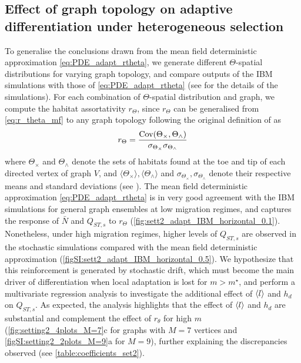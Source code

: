   \subsection{Effect of graph topology on adaptive differentiation under heterogeneous selection}\label{sec:result2b}
  To generalise the conclusions drawn from the mean field deterministic approximation \cref{eq:PDE_adapt_rtheta}, we generate different $\Theta$-spatial distributions for varying graph topology, and compare outputs of the IBM simulations with those of \cref{eq:PDE_adapt_rtheta} (see  for the details of the simulations). For each combination of $\Theta$-spatial distribution and graph, we compute the habitat assortativity $r_\Theta$, since $r_\Theta$ can be generalised from \cref{eq:r_theta_mf} to any graph topology following the original definition of \cite{Newman2003a} as
  \begin{equation}\label{eq:r_theta}
	r_\Theta = \frac{\mbox{Cov}({ \Theta}_\times, { \Theta}_\wedge)}{\sigma_{{ \Theta}_\times} \sigma_{{ \Theta}_\wedge}}
  \end{equation}
  where ${ \Theta}_\times$ and ${ \Theta}_\wedge$ denote the sets of habitats found at the toe and tip of each directed vertex of graph $V$, and $\langle { \Theta}_\times \rangle, \langle {\Theta}_\wedge \rangle$ and $\sigma_{{\Theta}_\times}, \sigma_{{\Theta}_\wedge}$ denote their respective means and standard deviations (see ). 
  The mean field deterministic approximation \cref{eq:PDE_adapt_rtheta} is in very good agreement with the IBM simulations for general graph ensembles at low migration regimes, and captures the response of $\bar{N}$ and $Q_{ST,s}$ to $r_\Theta$ (\cref{fig:sett2_adapt_IBM_horizontal_0.1}). Nonetheless, under high migration regimes, higher levels of $Q_{ST,s}$ are observed in the stochastic simulations compared with the mean field deterministic approximation (\cref{figSI:sett2_adapt_IBM_horizontal_0.5}). We hypothesize that this reinforcement is generated by stochastic drift, which must become the main driver of differentiation when local adaptation is lost for $m>m^\star$, and perform a multivariate regression analysis to investigate the additional effect of $\langle l \rangle$ and $h_d$ on $Q_{ST,s}$. As expected, the analysis highlights that the effect of $\langle l \rangle$ and $h_d$ are substantial and complement the effect of $r_\theta$ for high $m$ (\cref{fig:setting2_4plots_M=7}c for graphs with $M = 7$ vertices and \cref{figSI:setting2_2plots_M=9}a for $M=9$), further explaining the discrepancies observed (see \cref{table:coefficients_set2}).
  
